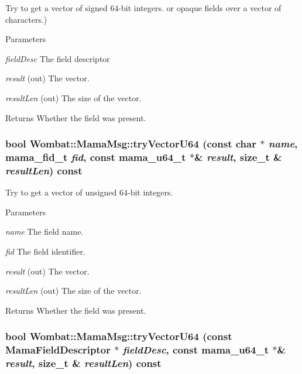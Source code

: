 Try to get a vector of signed 64-\/bit integers. or opaque fields over a vector of characters.) 
\begin{DoxyParams}{Parameters}
\item[{\em fieldDesc}]The field descriptor \item[{\em result}](out) The vector. \item[{\em resultLen}](out) The size of the vector. \end{DoxyParams}
\begin{DoxyReturn}{Returns}
Whether the field was present. 
\end{DoxyReturn}
\hypertarget{classWombat_1_1MamaMsg_a7a4e9494bf81aa6c415b4387b0fa662b}{
\subsubsection[{tryVectorU64}]{\setlength{\rightskip}{0pt plus 5cm}bool Wombat::MamaMsg::tryVectorU64 (const char $\ast$ {\em name}, \/  mama\_\-fid\_\-t {\em fid}, \/  const mama\_\-u64\_\-t $\ast$\& {\em result}, \/  size\_\-t \& {\em resultLen}) const}}
\label{classWombat_1_1MamaMsg_a7a4e9494bf81aa6c415b4387b0fa662b}


Try to get a vector of unsigned 64-\/bit integers. 
\begin{DoxyParams}{Parameters}
\item[{\em name}]The field name. \item[{\em fid}]The field identifier. \item[{\em result}](out) The vector. \item[{\em resultLen}](out) The size of the vector. \end{DoxyParams}
\begin{DoxyReturn}{Returns}
Whether the field was present. 
\end{DoxyReturn}
\hypertarget{classWombat_1_1MamaMsg_a48a026a5dd78f1bc11202a7f1827a8f5}{
\subsubsection[{tryVectorU64}]{\setlength{\rightskip}{0pt plus 5cm}bool Wombat::MamaMsg::tryVectorU64 (const {\bf MamaFieldDescriptor} $\ast$ {\em fieldDesc}, \/  const mama\_\-u64\_\-t $\ast$\& {\em result}, \/  size\_\-t \& {\em resultLen}) const}}
\label{classWombat_1_1MamaMsg_a48a026a5dd78f1bc11202a7f1827a8f5}


